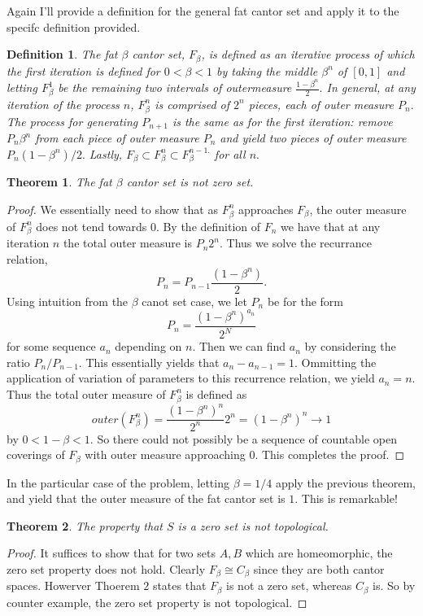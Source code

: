 \documentclass[letter]{article}
\newtheorem{theorem}{Theorem}
\newtheorem{definition}{Definition}
\newenvironment{menumerate}{%
  \edef\backupindent{\the\parindent}%
  \enumerate%
  \setlength{\parindent}{\backupindent}%
}{\endenumerate}
\begin{document}
\begin{menumerate}
	\item Again I'll provide a definition for the general fat cantor set and apply it to the specifc definition provided.
	\begin{definition}
		The fat $\beta$ cantor set, $F_\beta$, is defined as an iterative process of which the first iteration is defined for $0 < \beta < 1$ by taking the middle $\beta^n$ of $[0,1]$ and letting $F^1_\beta$ be the remaining two intervals of outermeasure $\frac{1-\beta^n}{2}.$ In general, at any iteration of the process $n$, $F^n_\beta$ is comprised of $2^n$ pieces, each of outer measure $P_n.$ The process for generating $P_{n+1}$ is the same as for the first iteration: remove $P_n\beta^n$ from each piece of outer measure $P_n$ and yield two pieces of outer measure $P_n(1-\beta^n)/2.$ Lastly, $F_\beta \subset F_\beta^n\subset F_\beta^{n-1.}$ for all $n.$
	\end{definition}

	\begin{theorem}
		The fat $\beta$ cantor set is not zero set.
	\end{theorem}
	\begin{proof}
	We essentially need to show that as $F_\beta^n$ approaches $F_\beta$, the outer measure of $F_\beta^n$ does not tend towards $0$. By the definition of $F_n$ we have that at any iteration $n$ the total outer measure is $P_n2^n.$ Thus we solve the recurrance relation, $$P_n = P_{n-1}\frac{(1-\beta^n)}{2}.$$ Using intuition from the $\beta$ canot set case, we let $P_n$ be for the form $$P_n = \frac{(1-\beta^n)^{a_n}}{2^N}$$ for some sequence $a_n$ depending on $n.$ Then we can find $a_n$ by considering the ratio $P_n/P_{n-1}.$ This essentially yields that $a_n - a_{n-1} = 1.$ Ommitting the application of variation of parameters to this recurrence relation, we yield $a_n = n.$ Thus the total outer measure of $F^n_\beta$ is defined as 
	$$outer(F^n_\beta) = \frac{(1-\beta^n)^n}{2^n}2^n = (1-\beta^n)^n \to 1$$
	by $0<1-\beta<1.$ So there could not possibly be a sequence of countable open coverings of $F_\beta$ with outer measure approaching $0.$ This completes the proof.
	\end{proof}

	In the particular case of the problem, letting $\beta = 1/4$ apply the previous theorem, and yield that the outer measure of the fat cantor set is $1.$ This is remarkable!

	\begin{theorem}
		The property that $S$ is a zero set is not topological.
	\end{theorem}
	\begin{proof}
		It suffices to show that for two sets $A,B$ which are homeomorphic, the zero set property does not hold. Clearly $F_\beta \cong C_\beta$ since they are both cantor spaces. Howerver Thoerem $2$ states that $F_\beta$ is not a zero set, whereas $C_\beta$ is. So by counter example, the zero set property is not topological.
	\end{proof}


\end{menumerate}
\end{document}
